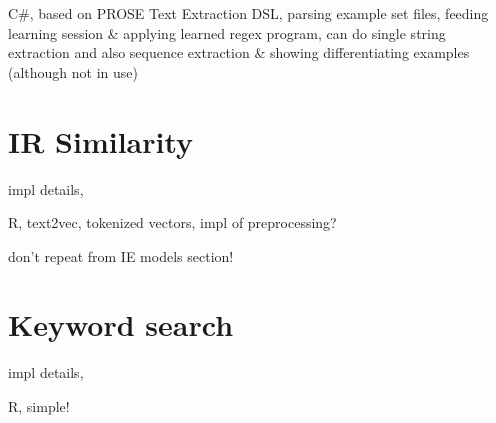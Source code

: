 \documentclass[\myrootdir/main.tex]{subfiles}
\begin{document}
C\#, based on PROSE Text Extraction DSL, parsing example set files, feeding learning session \& applying learned regex program, can do single string extraction and also sequence extraction \& showing differentiating examples (although not in use)

\section{IR Similarity}
impl details,

R, text2vec, tokenized vectors, impl of preprocessing?

don't repeat from IE models section!

\section{Keyword search}
impl details,

R, simple!
\end{document}
